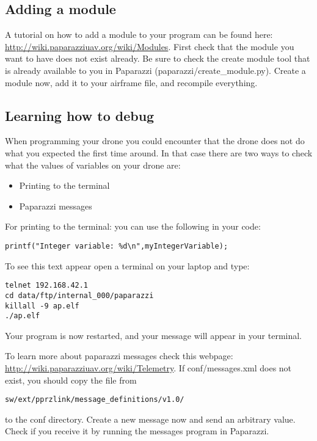 \documentclass{article}
\begin{document}
\subsection*{Adding a module}
A tutorial on how to add a module to your program can be found here: \url{http://wiki.paparazziuav.org/wiki/Modules}.
First check that the module you want to have does not exist already. Be sure to check the create module tool that is already available to you in Paparazzi (paparazzi/create\_module.py). 
Create a module now, add it to your airframe file, and recompile everything. 

\subsection*{Learning how to debug}
When programming your drone you could encounter that the drone does not do what you expected the first time around. In that case there are two ways to check what the values of variables on your drone are:
\begin{itemize}
	\item Printing to the terminal
	\item Paparazzi messages
\end{itemize}
For printing to the terminal: you can use the following in your code:

\begin{verbatim}
printf("Integer variable: %d\n",myIntegerVariable);
\end{verbatim}
To see this text appear open a terminal on your laptop and type:
\begin{verbatim}
telnet 192.168.42.1
cd data/ftp/internal_000/paparazzi
killall -9 ap.elf 
./ap.elf
\end{verbatim}
Your program is now restarted, and your message will appear in your terminal. 

\bigskip
To learn more about paparazzi messages check this webpage: \url{http://wiki.paparazziuav.org/wiki/Telemetry}.
If conf/messages.xml does not exist, you should copy the file from \begin{verbatim}sw/ext/pprzlink/message_definitions/v1.0/\end{verbatim} to the conf directory.
Create a new message now and send an arbitrary value. Check if you receive it by running the messages program in Paparazzi. 
\end{document}
